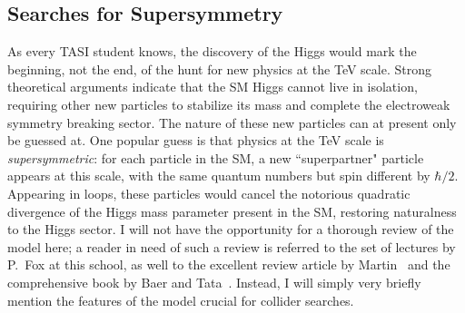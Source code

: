 \documentclass{ws-procs9x6}
\begin{document}
\subsection{Searches for Supersymmetry}

As every TASI student knows, the discovery of the Higgs would mark the beginning, not the end, of the hunt for new physics at the TeV scale. Strong theoretical arguments indicate that the SM Higgs cannot live in isolation, requiring other new particles to stabilize its mass and complete the electroweak symmetry breaking sector. The nature of these new particles can at present only be guessed at. One popular guess is that physics at the TeV scale is {\it supersymmetric}: for each particle in the SM, a new ``superpartner" particle appears at this scale, with the same quantum numbers but spin different by $\hbar/2$. Appearing in loops, these particles would cancel the notorious quadratic divergence of the Higgs mass parameter present in the SM, restoring naturalness to the Higgs sector. I will not have the opportunity for a thorough review of the model here; a reader in need of such a review is referred to the set of lectures by P.~Fox at this school, as well to the excellent review article by Martin~\cite{Martin} and the comprehensive book by Baer and Tata~\cite{BT}. Instead, I will simply very briefly mention the features of the model crucial for collider searches.
\end{document}
